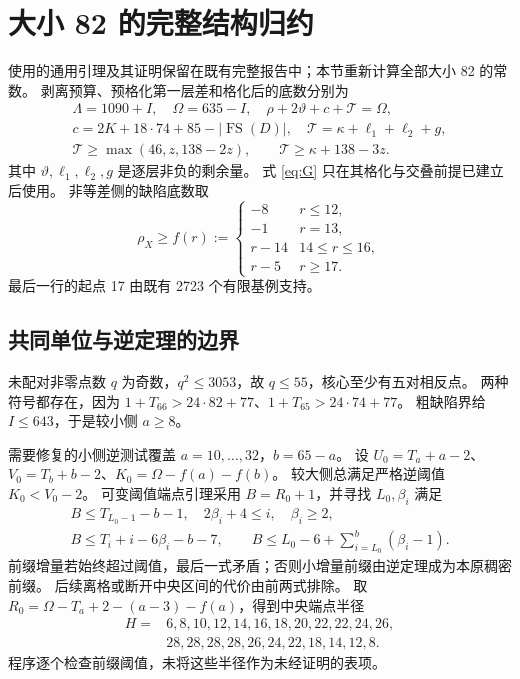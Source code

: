 \documentclass[11pt,a4paper]{article}
\newcommand{\FS}{\operatorname{FS}}\newcommand{\Z}{\mathbb Z}\newcommand{\T}{T}
\newcommand{\need}{\mathcal T}\newcommand{\eps}{\varepsilon}
\begin{document}
\section{大小 82 的完整结构归约}\label{sec:structure}
使用的通用引理及其证明保留在既有完整报告中；本节重新计算全部大小 82 的常数。
剥离预算、预格化第一层差和格化后的底数分别为
\begin{gather}
 \Lambda=1090+I,\quad\Omega=635-I,\quad
 \rho+2\vartheta+c+\need=\Omega,\label{eq:struct}\\
 c=2K+18\cdot74+85-|\FS(D)|,\quad
 \need=\kappa+\ell_1+\ell_2+g,\nonumber\\
 \need\ge\max(46,z,138-2z),\qquad \need\ge\kappa+138-3z.\label{eq:G}
\end{gather}
其中 $\vartheta,\ell_1,\ell_2,g$ 是逐层非负的剩余量。
式 \eqref{eq:G} 只在其格化与交叠前提已建立后使用。
非等差侧的缺陷底数取
\[
 \rho_X\ge f(r):=
 \begin{cases}-8&r\le12,\\-1&r=13,\\r-14&14\le r\le16,\\r-5&r\ge17.\end{cases}
\]
最后一行的起点 17 由既有 2723 个有限基例支持。

\subsection{共同单位与逆定理的边界}
未配对非零点数 $q$ 为奇数，$q^2\le3053$，故 $q\le55$，核心至少有五对相反点。
两种符号都存在，因为
$1+T_{66}>24\cdot82+77$、$1+T_{65}>24\cdot74+77$。
粗缺陷界给 $I\le643$，于是较小侧 $a\ge8$。

需要修复的小侧逆测试覆盖 $a=10,\ldots,32$，$b=65-a$。
设 $U_0=T_a+a-2$、$V_0=T_b+b-2$、$K_0=\Omega-f(a)-f(b)$。
较大侧总满足严格逆阈值 $K_0<V_0-2$。
可变阈值端点引理采用 $B=R_0+1$，并寻找 $L_0,\beta_i$ 满足
\begin{gather*}
 B\le T_{L_0-1}-b-1,\quad 2\beta_i+4\le i,\quad\beta_i\ge2,\\
 B\le T_i+i-6\beta_i-b-7,\qquad
 B\le L_0-6+\sum_{i=L_0}^{b}(\beta_i-1).
\end{gather*}
前缀增量若始终超过阈值，最后一式矛盾；否则小增量前缀由逆定理成为本原稠密前缀。
后续离格或断开中央区间的代价由前两式排除。
取 $R_0=\Omega-T_a+2-(a-3)-f(a)$，得到中央端点半径
\[
\begin{split}
 H={}&6,8,10,12,14,16,18,20,22,22,24,26,\\
     &28,28,28,28,26,24,22,18,14,12,8.
\end{split}
\]
程序逐个检查前缀阈值，未将这些半径作为未经证明的表项。
\end{document}
